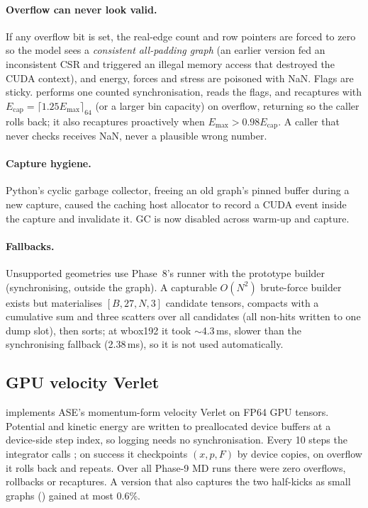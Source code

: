 \paragraph{Overflow can never look valid.} If any overflow bit is set, the real-edge count and row pointers are forced to zero so the model sees a \emph{consistent all-padding graph} (an earlier version fed an inconsistent CSR and triggered an illegal memory access that destroyed the CUDA context), and energy, forces and stress are poisoned with NaN. Flags are sticky.  performs one counted synchronisation, reads the flags, and recaptures with $E_{\text{cap}}=\lceil1.25E_{\max}\rceil_{64}$ (or a larger bin capacity) on overflow, returning  so the caller rolls back; it also recaptures proactively when $E_{\max}>0.98E_{\text{cap}}$. A caller that never checks receives NaN, never a plausible wrong number.

\paragraph{Capture hygiene.} Python's cyclic garbage collector, freeing an old graph's pinned buffer during a new capture, caused the caching host allocator to record a CUDA event inside the capture and invalidate it. GC is now disabled across warm-up and capture.

\paragraph{Fallbacks.} Unsupported geometries use Phase~8's runner with the prototype builder (synchronising, outside the graph). A capturable $O(N^2)$ brute-force builder exists but materialises $[B,27,N,3]$ candidate tensors, compacts with a cumulative sum and three scatters over all candidates (all non-hits written to one dump slot), then sorts; at wbox192 it took $\sim$4.3\,ms, slower than the synchronising fallback (2.38\,ms), so it is not used automatically.

\subsection{GPU velocity Verlet}
 implements ASE's momentum-form velocity Verlet on FP64 GPU tensors. Potential and kinetic energy are written to preallocated device buffers at a device-side step index, so logging needs no synchronisation. Every 10 steps the integrator calls ; on success it checkpoints $(x,p,F)$ by device copies, on overflow it rolls back and repeats. Over all Phase-9 MD runs there were zero overflows, rollbacks or recaptures. A version that also captures the two half-kicks as small graphs () gained at most 0.6\%.

